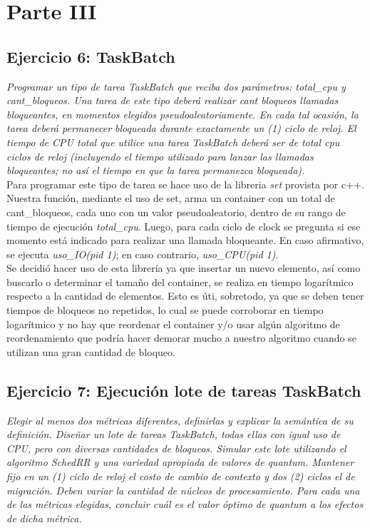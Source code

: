 \documentclass[a4paper]{article}
\begin{document}
\newpage
\section{Parte III}


 \subsection{Ejercicio 6: TaskBatch}
\textit{Programar un tipo de tarea TaskBatch que reciba dos par\'ametros: total_cpu y cant_bloqueos. Una tarea de este tipo deber\'a realizar cant bloqueos llamadas bloqueantes, en momentos elegidos pseudoaleatoriamente. En cada tal ocasi\'on, la tarea deber\'a permanecer bloqueada durante exactamente un (1) ciclo de reloj. El tiempo de CPU total que utilice una tarea TaskBatch deber\'a ser de total cpu ciclos de reloj (incluyendo el tiempo utilizado para lanzar las llamadas bloqueantes; no as\'i el tiempo en que la tarea permanezca bloqueada).}\\

Para programar este tipo de tarea se hace uso de la libreria \emph{set} provista por c++. Nuestra funci\'on, mediante el uso de set, arma un container con un total de cant_bloqueos, cada uno con un valor pseudoaleatorio, dentro de su rango de tiempo de ejecuci\'on \emph{total_cpu}. 
Luego, para cada ciclo de clock se pregunta si ese momento est\'a indicado para realizar una llamada bloqueante. En caso afirmativo, se ejecuta \textit{uso_IO(pid 1)}; en caso contrario, \textit{uso_CPU(pid 1)}.\\
Se decidió hacer uso de esta librería ya que insertar un nuevo elemento, así como buscarlo o determinar el tamaño del container, se realiza en tiempo logarítmico respecto a la cantidad de elementos. Esto es úti, sobretodo, ya que se deben tener tiempos de bloqueos no repetidos, lo cual se puede corroborar en tiempo logarítmico y no hay que reordenar el container y/o usar algún algoritmo de reordenamiento que podría hacer demorar mucho a nuestro algoritmo cuando se utilizan una gran cantidad de bloqueo. 

\bigskip 
 \subsection{Ejercicio 7: Ejecuci\'on lote de tareas TaskBatch}
\textit{Elegir al menos dos m\'etricas diferentes, definirlas y explicar la sem\'antica de su definici\'on. Dise\~nar un lote de tareas TaskBatch, todas ellas con igual uso de CPU, pero con diversas cantidades de bloqueos. Simular este lote utilizando el algoritmo SchedRR y una variedad apropiada de valores de quantum. Mantener fijo en un (1) ciclo de reloj el costo de cambio de contexto y dos (2) ciclos el de migraci\'on. Deben variar la cantidad de n\'ucleos de procesamiento. Para cada una de las m\'etricas elegidas, concluir cu\'al es el valor \'optimo de quantum a los efectos de dicha m\'etrica.}\\
\end{document}
